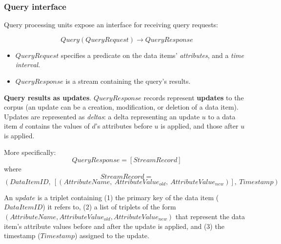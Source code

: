 \subsubsection{Query interface}
\label{ref:query_interface}

Query processing units expose an interface for receiving query requests:

\begin{displaymath}
  Query(QueryRequest) \rightarrow QueryResponse
\end{displaymath}

\begin{itemize}
  \item $QueryRequest$ specifies a predicate on the data items' \textit{attributes}, and a \textit{time interval}.

  \item $QueryResponse$ is a stream containing the query's results.
\end{itemize}

\noindent
\textbf{Query results as updates}.
$QueryResponse$ records represent \textbf{updates} to the corpus (an update can be a creation, modification, or deletion
of a data item).
Updates are represented as \textit{deltas}:
a delta representing an update $u$ to a data item $d$ contains the values of $d$'s attributes before $u$ is applied,
and those after $u$ is applied.

More specifically:
\[
  QueryResponse = [StreamRecord]
\]
where
\[
  StreamRecord =
\]
\[
  (DataItemID,~[(AttributeName,~AttributeValue_{old},~AttributeValue_{new})],~Timestamp)
\]

\begin{sloppypar}
An $update$ is a triplet containing
(1) the primary key of the data item ($DataItemID$) it refers to,
(2) a list of triplets of the form $(AttributeName, AttributeValue_{old}, AttributeValue_{new})$ that represent the
data item's attribute values before and after the update is applied,
and (3) the timestamp ($Timestamp$) assigned to the update.
\end{sloppypar}

